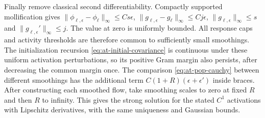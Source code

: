 Finally remove classical second differentiability.  Compactly supported
mollification gives
$\|\phi_{\ell,\epsilon}-\phi_\ell\|_\infty\le Cs\epsilon$,
$\|g_{\ell,\epsilon}-g_\ell\|_\infty\le Cj\epsilon$,
$\|g_{\ell,\epsilon}\|_\infty\le s$ and
$\|g_{\ell,\epsilon}'\|_\infty\le j$.
The value at zero is uniformly bounded.  All response caps and activity
thresholds are therefore common to sufficiently small smoothings.
The initialization recursion \eqref{eq:at-initial-covariance} is continuous
under these uniform activation perturbations, so its positive Gram margin
also persists, after decreasing the common margin once.
The comparison \eqref{eq:at-pop-cauchy} between different smoothings
has the additional term $C(1+R)(\epsilon+\epsilon')$ inside braces.
After constructing each smoothed flow, take smoothing scales to zero at
fixed $R$ and then $R$ to infinity.  This gives the strong solution for
the stated $C^1$ activations with Lipschitz derivatives, with the same
uniqueness and Gaussian bounds.

